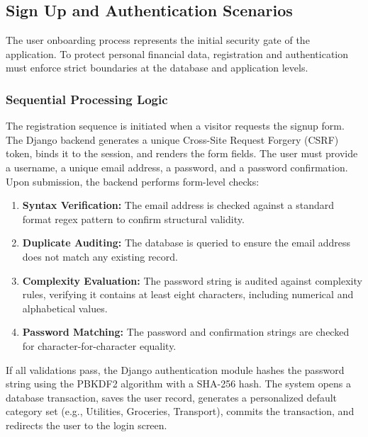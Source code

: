 \subsection{Sign Up and Authentication Scenarios}
The user onboarding process represents the initial security gate of the application. To protect personal financial data, registration and authentication must enforce strict boundaries at the database and application levels.
\subsubsection{Sequential Processing Logic}
The registration sequence is initiated when a visitor requests the signup form. The Django backend generates a unique Cross-Site Request Forgery (CSRF) token, binds it to the session, and renders the form fields. The user must provide a username, a unique email address, a password, and a password confirmation. Upon submission, the backend performs form-level checks:
\begin{enumerate}
	\item \textbf{Syntax Verification:} The email address is checked against a standard format regex pattern to confirm structural validity.
	\item \textbf{Duplicate Auditing:} The database is queried to ensure the email address does not match any existing record.
	\item \textbf{Complexity Evaluation:} The password string is audited against complexity rules, verifying it contains at least eight characters, including numerical and alphabetical values.
	\item \textbf{Password Matching:} The password and confirmation strings are checked for character-for-character equality.
\end{enumerate}
If all validations pass, the Django authentication module hashes the password string using the PBKDF2 algorithm with a SHA-256 hash. The system opens a database transaction, saves the user record, generates a personalized default category set (e.g., Utilities, Groceries, Transport), commits the transaction, and redirects the user to the login screen.

